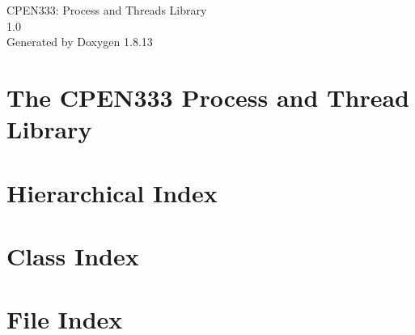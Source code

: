 \documentclass[twoside]{book}
\newcommand{\+}{\discretionary{\mbox{\scriptsize$\hookleftarrow$}}{}{}}
\newcommand{\clearemptydoublepage}{%
  \newpage{\pagestyle{empty}\cleardoublepage}%
}
\begin{document}
\hypersetup{pageanchor=false,
             bookmarksnumbered=true,
             pdfencoding=unicode
            }
\begin{titlepage}
\vspace*{7cm}
\begin{center}%
{\Large C\+P\+E\+N333\+: Process and Threads Library \\[1ex]\large 1.\+0 }\\
\vspace*{1cm}
{\large Generated by Doxygen 1.8.13}\\
\end{center}
\end{titlepage}
\clearemptydoublepage
{}
\tableofcontents
\clearemptydoublepage
{}
\hypersetup{pageanchor=true}

\chapter{The C\+P\+E\+N333 Process and Thread Library}
\label{index}\hypertarget{index}{}
\chapter{Hierarchical Index}

\chapter{Class Index}

\chapter{File Index}

\end{document}
